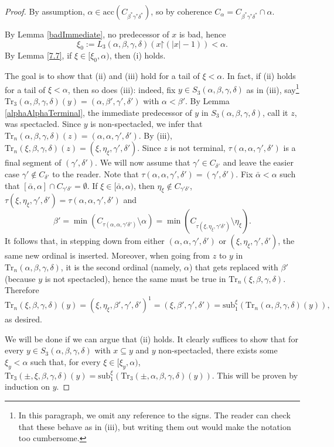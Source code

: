 \documentclass{amsart}
\numberwithin{theorem}{section}
\theoremstyle{definition}
\newcommand{\restr}{\mathord{\upharpoonright}}
\renewcommand{\subset}{\subseteq}
\newcommand{\acc}{\mathrm{acc}}
\newcommand{\sub}{\mathrm{sub}}
\newcommand{\Tr}{\mathrm{Tr}}
\begin{document}
\begin{proof}
By assumption, $\alpha\in\acc(C_{\beta^*\gamma^*\delta^*})$, so by coherence $C_\alpha=C_{\beta^*\gamma^*\delta^*}\cap\alpha$.

By Lemma \ref{badImmediate}, no predecessor of $x$ is bad, hence
\[
\xi_0:=L_3(\alpha,\beta,\gamma,\delta)(x\restr (|x|-1))<\alpha.
\]
By Lemma \ref{7.7}, if $\xi\in [\xi_0,\alpha)$, then (i) holds.


The goal is to show that (ii) and (iii) hold for a tail of $\xi<\alpha$. In fact, if (ii) holds for a tail of $\xi<\alpha$, then so does (iii): indeed, fix $y\in S_3(\alpha,\beta,\gamma,\delta)$ as in (iii), say\footnote{In this paragraph, we omit any reference to the signs. The reader can check that these behave as in (iii), but writing them out would make the notation too cumbersome.} $\Tr_3(\alpha,\beta,\gamma,\delta)(y)=(\alpha,\beta',\gamma',\delta')$ with $\alpha<\beta'$. By Lemma \ref{alphaAlphaTerminal}, the immediate predecessor of $y$ in $S_3(\alpha,\beta,\gamma,\delta)$, call it $z$, was spectacled. Since $y$ is non-spectacled, we infer that  $\Tr_n(\alpha,\beta,\gamma,\delta)(z)=(\alpha,\alpha,\gamma',\delta')$. By (iii), $\Tr_n(\xi,\beta,\gamma,\delta)(z)=(\xi,\eta_\xi,\gamma',\delta')$. Since $z$ is not terminal, $\tau(\alpha,\alpha,\gamma',\delta')$ is a final segment of $ (\gamma',\delta')$. We will now assume that $\gamma'\in C_{\delta'}$ and leave the easier case $\gamma'\not\in C_{\delta'}$ to the reader. Note that $\tau(\alpha,\alpha,\gamma',\delta')=(\gamma',\delta')$. Fix $\bar\alpha<\alpha$ such that $[\bar\alpha,\alpha]\cap C_{\gamma'\delta'}=\emptyset$. If $\xi \in [\bar\alpha,\alpha)$, then $\eta_\xi\not\in C_{\gamma'\delta'}$, $\tau(\xi,\eta_\xi,\gamma',\delta')=\tau(\alpha,\alpha,\gamma',\delta')$ and
\[
\beta'=\min(C_{\tau(\alpha,\alpha,\gamma'\delta')}\setminus \alpha)=\min(C_{\tau(\xi,\eta_\xi,\gamma'\delta')}\setminus \eta_\xi).
\] 
It follows that, in stepping down from either $(\alpha,\alpha,\gamma',\delta')$ or $(\xi,\eta_\xi,\gamma',\delta')$, the same new ordinal is inserted. Moreover, when going from $z$ to $y$ in $\Tr_n(\alpha,\beta,\gamma,\delta)$, it is the second ordinal (namely, $\alpha$) that gets replaced with $\beta'$ (because $y$ is not spectacled), hence the same must be true in $\Tr_n(\xi,\beta,\gamma,\delta)$. Therefore
\[
\Tr_n(\xi,\beta,\gamma,\delta)(y)=(\xi,\eta_\xi,\beta',\gamma',\delta')^1=(\xi,\beta',\gamma',\delta')=\sub_1^\xi(\Tr_n(\alpha,\beta,\gamma,\delta)(y)),
\]
as desired.


We will be done if we can argue that (ii) holds. It clearly suffices to show that for every $y\in S_3(\alpha,\beta,\gamma,\delta)$ with $x\subset y$ and $y$ non-spectacled, there exists some $\xi_y<\alpha$ such that, for every $\xi \in [\xi_y,\alpha)$, $\Tr_3(\pm,\xi,\beta,\gamma,\delta)(y)=\sub_1^\xi(\Tr_3(\pm,\alpha,\beta,\gamma,\delta)(y))$. This will be proven by induction on $y$.


\end{proof}
\end{document}
